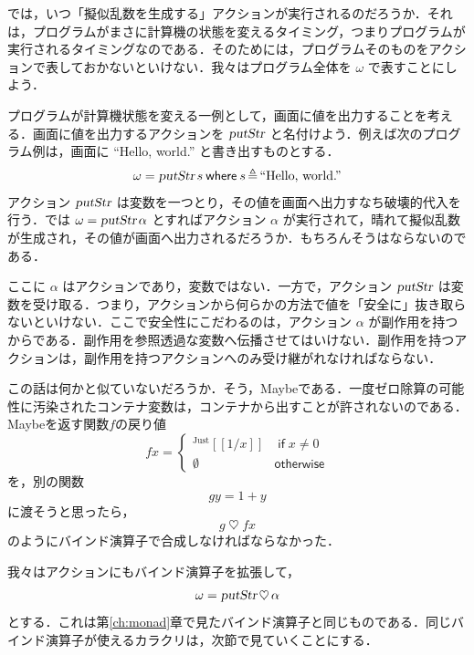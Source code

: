 \documentclass[a4paper,twocolumn]{jsbook}
\def\[{\left[\!\left[}
\def\]{\right]\!\right]}
\newcommand{\mKeyword}[1]{\mathsf{#1}} %
\newcommand{\mIfKeyword}{\mKeyword{if}}
\newcommand{\mOtherwiseKeyword}{\mKeyword{otherwise}}
\newcommand{\mWhereKeyword}{\mKeyword{where}}
\DeclareMathOperator{\mIf}{\mIfKeyword}
\DeclareMathOperator{\mOtherwise}{\mOtherwiseKeyword}
\newcommand{\mNothing}{\emptyset}
\newcommand{\mString}[1]{\text{#1}}
\newcommand{\mAction}[1]{\textsl{#1}}
\DeclareMathOperator{\mPutStr}{\mAction{putStr}}
\DeclareMathOperator{\mBind}{\heartsuit}
\DeclareMathOperator{\mLetEq}{\triangleq}
\newcommand{\mGenericValueConstructor}[1]{\mathrm{#1}}
\newcommand{\mGenericWith}[2]{{}^\mGenericValueConstructor{#1}\[#2\]}
\newcommand{\mJustWith}[1]{\mGenericWith{Just}{#1}}
\newcommand{\mWhereIs}[2]{\mathbin{\mWhereKeyword}#1\mLetEq#2}
\begin{document}
では，いつ「擬似乱数を生成する」アクションが実行されるのだろうか．それは，プログラムがまさに計算機の状態を変えるタイミング，つまりプログラムが実行されるタイミングなのである．そのためには，プログラムそのものをアクションで表しておかないといけない．我々はプログラム全体を $\omega$ で表すことにしよう．

プログラムが計算機状態を変える一例として，画面に値を出力することを考える．画面に値を出力するアクションを $\mPutStr$ と名付けよう．例えば次のプログラム例は，画面に ``Hello, world.'' と書き出すものとする．
\begin{equation}
\omega=\mPutStr s\mWhereIs{s}{\mString{``Hello, world.''}}
\end{equation}
アクション $\mPutStr$ は変数を一つとり，その値を画面へ出力すなち破壊的代入を行う．では $\omega=\mPutStr\alpha$ とすればアクション $\alpha$ が実行されて，晴れて擬似乱数が生成され，その値が画面へ出力されるだろうか．もちろんそうはならないのである．

ここに $\alpha$ はアクションであり，変数ではない．一方で，アクション $\mPutStr$ は変数を受け取る．つまり，アクションから何らかの方法で値を「安全に」抜き取らないといけない．ここで安全性にこだわるのは，アクション $\alpha$ が副作用を持つからである．副作用を参照透過な変数へ伝播させてはいけない．副作用を持つアクションは，副作用を持つアクションへのみ受け継がれなければならない．

この話は何かと似ていないだろうか．そう，Maybeである．一度ゼロ除算の可能性に汚染されたコンテナ変数は，コンテナから出すことが許されないのである．Maybeを返す関数$f$の戻り値
\begin{equation}
fx=\begin{cases}
\mJustWith{1/x}&\mIf x\neq0\\
\mNothing&\mOtherwise
\end{cases}
\end{equation}
を，別の関数
\begin{equation}
gy=1+y
\end{equation}
に渡そうと思ったら，
\begin{equation}
g\mBind fx
\end{equation}
のようにバインド演算子で合成しなければならなかった．

我々はアクションにもバインド演算子を拡張して，
\begin{equation}
\omega=\mPutStr\mBind\alpha
\end{equation}
とする．これは第\ref{ch:monad}章で見たバインド演算子と同じものである．同じバインド演算子が使えるカラクリは，次節で見ていくことにする．
\end{document}
